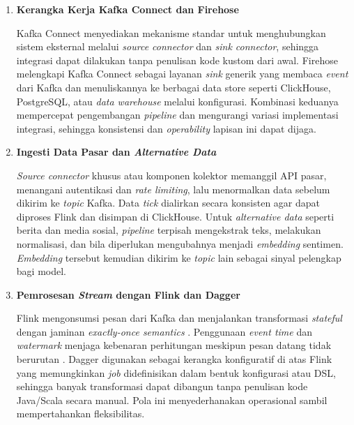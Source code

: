 \begin{enumerate}
    \item \textbf{Kerangka Kerja Kafka Connect dan Firehose}  

    Kafka Connect menyediakan mekanisme standar untuk menghubungkan sistem eksternal melalui \textit{source connector} dan \textit{sink connector}, sehingga integrasi dapat dilakukan tanpa penulisan kode kustom dari awal. Firehose melengkapi Kafka Connect sebagai layanan \textit{sink} generik yang membaca \textit{event} dari Kafka dan menuliskannya ke berbagai data store seperti ClickHouse, PostgreSQL, atau \textit{data warehouse} melalui konfigurasi. Kombinasi keduanya mempercepat pengembangan \textit{pipeline} dan mengurangi variasi implementasi integrasi, sehingga konsistensi dan \textit{operability} lapisan ini dapat dijaga.

    \vspace{0.5em}

    \item \textbf{Ingesti Data Pasar dan \textit{Alternative Data}}  

    \textit{Source connector} khusus atau komponen kolektor memanggil API pasar, menangani autentikasi dan \textit{rate limiting}, lalu menormalkan data sebelum dikirim ke \textit{topic} Kafka. Data \textit{tick} dialirkan secara konsisten agar dapat diproses Flink dan disimpan di ClickHouse. Untuk \textit{alternative data} seperti berita dan media sosial, \textit{pipeline} terpisah mengekstrak teks, melakukan normalisasi, dan bila diperlukan mengubahnya menjadi \textit{embedding} sentimen. \textit{Embedding} tersebut kemudian dikirim ke \textit{topic} lain sebagai sinyal pelengkap bagi model.

    \vspace{0.5em}

    \item \textbf{Pemrosesan \textit{Stream} dengan Flink dan Dagger}  

    Flink mengonsumsi pesan dari Kafka dan menjalankan transformasi \textit{stateful} dengan jaminan \textit{exactly-once semantics} \autocite{apacheflink2024}. Penggunaan \textit{event time} dan \textit{watermark} menjaga kebenaran perhitungan meskipun pesan datang tidak berurutan \autocite{carbone2015apache}. Dagger digunakan sebagai kerangka konfiguratif di atas Flink yang memungkinkan \textit{job} didefinisikan dalam bentuk konfigurasi atau DSL, sehingga banyak transformasi dapat dibangun tanpa penulisan kode Java/Scala secara manual. Pola ini menyederhanakan operasional sambil mempertahankan fleksibilitas.


\end{enumerate}
